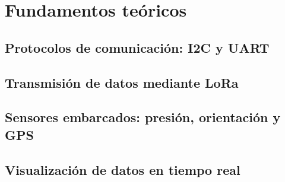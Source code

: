 \chapter{Fundamentos teóricos}
\label{cap:fundamentos_teoricos}

\section{Protocolos de comunicación: I2C y UART}
\section{Transmisión de datos mediante LoRa}
\section{Sensores embarcados: presión, orientación y GPS}
\section{Visualización de datos en tiempo real}
